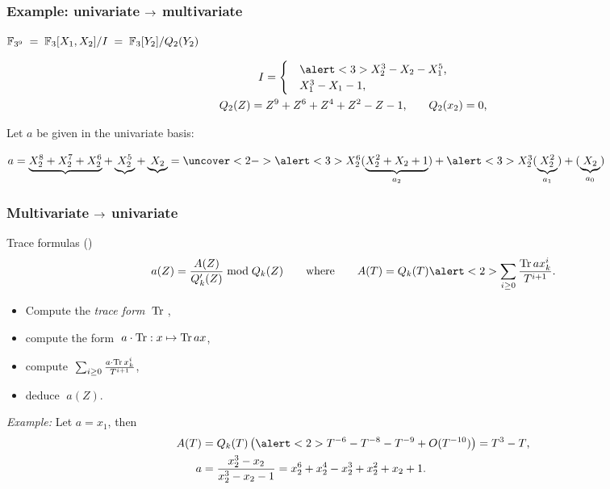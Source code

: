 \documentclass[10pt,usepdftitle=false]{beamer}
\begin{document}
\begin{frame}
  \frametitle{Example: univariate $\rightarrow$ multivariate}
  
  \begin{center}
    \large\emph{$\mathbb{F}_{3^9} \;=\; \mathbb{F}_3[X_1,X_2]/I \;=\; \mathbb{F}_3[Y_2]/Q_2(Y_2)$}
  \end{center}

  \begin{gather*}
    I = 
    \begin{cases}
      &\alert<3>{X_2^3 - X_2 - X_1^5}\text{,}\\
      &X_1^3 - X_1 - 1\text{,}
    \end{cases}
    \\
    Q_2(Z) = Z^9 + Z^6 + Z^4 + Z^2 - Z - 1\text{,} \qquad Q_2(x_2) = 0\text{,}
  \end{gather*}

  \bigskip

  Let $a$ be given in the univariate basis:

  \smallskip

  \mbox{$a = \underbrace{X_2^8 + X_2^7 + X_2^6} + \underbrace{X_2^5} +
    \underbrace{X_2} = \uncover<2->{\alert<3>{X_2^6}(\underbrace{X_2^2
        + X_2 + 1}_{a_2}) + \alert<3>{X_2^3}(\underbrace{X_2^2}_{a_1})
      + (\underbrace{X_2}_{a_0})}$}
  
  \bigskip

  \bigskip

\end{frame}


\begin{frame}
  \frametitle{Multivariate $\rightarrow$ univariate}


  \begin{block}{Trace formulas (\cite{rouiller99})}
      \[
      a(Z) = \frac{A(Z)}{Q_k'(Z)}\bmod Q_k(Z)
      \qquad\text{where}\qquad
      A(T) = Q_k(T)\alert<2>{\sum_{i\ge 0}\frac{\Tr ax_k^i}{T^{i+1}}}
      \text{.}\]
    \begin{itemize}
    \item Compute the \textit{trace form} $\;\operatorname{Tr}\;$,
    \item compute the form $\;a\cdot\operatorname{Tr} : x\mapsto \operatorname{Tr} ax$,
    \item \alert<2>{compute $\;\sum_{i\ge 0}\frac{a\cdot\operatorname{Tr} x_k^i}{T^{i+1}}$},
    \item deduce $\;a(Z)$.
    \end{itemize}
  \end{block}

  \emph{Example:} Let $a = x_1$, then
  \begin{align*}
    A(T) &= Q_k(T) \left(\alert<2>{T^{-6} - T^{-8} - T^{-9} + O(T^{-10})}\right) = T^3 - T\text{,}\\
    a &= \frac{x_2^3 - x_2}{x_2^3 - x_2 - 1} = x_2^6 +
    x_2^4 - x_2^3 + x_2^2 + x_2 + 1\text{.}
  \end{align*}
\end{frame}
\end{document}
